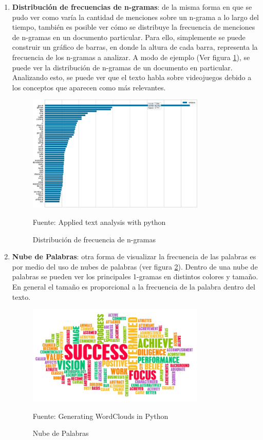 \begin{enumerate}
    \item \textbf{Distribución de frecuencias de n-gramas}:
        de la misma forma en que se pudo ver como varía la cantidad de menciones sobre un n-grama a lo largo del tiempo, también es posible ver cómo se distribuye la frecuencia de menciones de n-gramas en un documento particular. Para ello, simplemente se puede construir un gráfico de barras, en donde la altura de cada barra, representa la frecuencia de los n-gramas a analizar. A modo de ejemplo (Ver figura \ref{fig:DistribucionNgramas}), se puede ver la distribución de n-gramas de un documento en particular. Analizando esto, se puede ver que el texto habla sobre videojuegos debido a los conceptos que aparecen como más relevantes.
     \begin{figure}[h!]
        \centering
        \includegraphics[width=0.8\textwidth]{figures/Distribucion.png}
        \caption{\label{fig:DistribucionNgramas} Distribución de frecuencia de n-gramas} Fuente: Applied text analysis with python \cite{bengfort2018applied}
    \end{figure}
    \item \textbf{Nube de Palabras}: otra forma de visualizar la frecuencia de las palabras es por medio del uso de nubes de palabras (ver figura \ref{fig:WordClouds}). Dentro de una nube de palabras se pueden ver los principales 1-gramas en distintos colores y tamaño. En general el tamaño es proporcional a la frecuencia de la palabra dentro del texto.
    \begin{figure}[H]
        \centering
        \includegraphics[width=0.8\textwidth]{figures/Word-Cloud.png}
        \caption{\label{fig:WordClouds} Nube de Palabras} Fuente: Generating WordClouds in Python \cite{Word_Clouds}
    \end{figure}
\end{enumerate}
